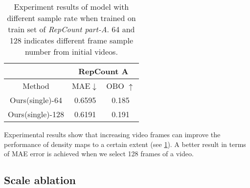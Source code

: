 \documentclass[10pt,twocolumn,letterpaper]{article}
\begin{document}
\begin{table}[ht]
	\begin{center}
		\begin{tabular}{c|cc}

			\hline
			                 & \multicolumn{2}{c}{RepCount A}                         \\ \hline
			Method           & \multicolumn{1}{c|}{MAE$\downarrow$} & OBO  $\uparrow$ \\\hline
			Ours(single)-64  & \multicolumn{1}{c|}{0.6595}          & 0.185           \\
			Ours(single)-128 & \multicolumn{1}{c|}{0.6191}          & 0.191           \\ \hline
		\end{tabular}
	\end{center}
	\caption{
		Experiment results of model with different sample rate when trained on train set of \emph{RepCount part-A}. 64 and 128 indicates different frame sample number from initial videos.
	}
	\label{tab:64_128}
\end{table}

Experimental results show that increasing video frames can improve the performance of density maps to a certain extent (see \cref{tab:64_128}). A better result in terms of MAE error is achieved when we select 128 frames of a video. 


\subsection{Scale ablation}
\end{document}
